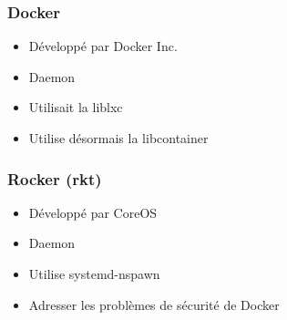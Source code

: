 \begin{frame}
     \frametitle{Docker}
    \begin{itemize}
      \item Développé par Docker Inc.
      \item Daemon
      \item Utilisait la liblxc
      \item Utilise désormais la libcontainer
    \end{itemize}
  \end{frame}

   \begin{frame}
     \frametitle{Rocker (rkt)}
    \begin{itemize}
      \item Développé par CoreOS
      \item Daemon
      \item Utilise systemd-nspawn
      \item Adresser les problèmes de sécurité de Docker
    \end{itemize}
  \end{frame}
